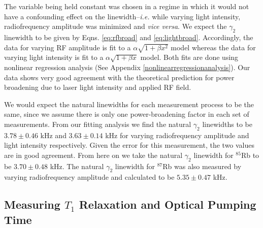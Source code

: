 The variable being held constant was chosen in a regime in which it would not have a confounding effect on the linewidth--\emph{i.e.} while varying light intensity, radiofrequency amplitude was minimized and \emph{vice versa}.  We expect the $\gamma_2$ linewidth to be given by 
Eqns. \ref{eq:rfbroad} and \ref{eq:lightbroad}. Accordingly, the data for varying RF amplitude is fit to a $\alpha \sqrt{1+\beta x^2}$ model whereas the data for varying light intensity is fit to a $\alpha \sqrt{1+\beta x}$ model.  Both fits are done using nonlinear regression analysis (See Appendix \ref{nonlinearregressionanalysis}).  Our data shows very good agreement with the theoretical prediction for power broadening due to laser light intensity and applied RF field.

We would expect the natural linewidths for each measurement process to be the same, since we assume there is only one power-broadening factor in each set of measurements. From our fitting analysis we find the natural $\gamma_2$ linewidths to be $3.78 \pm 0.46$ kHz and $3.63 \pm 0.14$ kHz for varying radiofrequency amplitude and light intensity respectively.  Given the error for this measurement, the two values are in good agreement. From here on we take the natural $\gamma_2$ linewidth for $^{85}$Rb to be $3.70 \pm 0.48$ kHz. The natural  $\gamma_2$ linewidth for $^{87}$Rb was also measured by varying radiofrequency amplitude and calculated to be $5.35 \pm 0.47$ kHz.

\subsection{Measuring $T_1$ Relaxation and Optical Pumping Time}\label{MeasuringT1RelaxationandOpticalPumpingTime}

